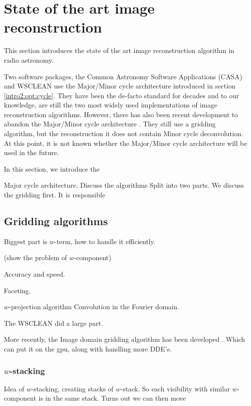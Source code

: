 \section{State of the art image reconstruction}
This section introduces the state of the art image reconstruction algorithm in radio astronomy. 

Two software packages, the Common Astronomy Software Applications (CASA)\cite{casa2019main} and WSCLEAN\cite{offringa2014wsclean} use the Major/Minor cycle architecture introduced in section \ref{intro2:opt:cycle}. They have been the de-facto standard for decades and to our knowledge, are still the two most widely used implementations of image reconstruction algorithms. However, there has also been recent development to abandon the Major/Minor cycle architecture \cite{pratley2017robust, dabbech2018cygnus}. They still use a gridding algorithm, but the reconstruction it does not contain Minor cycle deconvolution. At this point, it is not known whether the Major/Minor cycle architecture will be used in the future. 


In this section, we introduce the 


Major cycle architecture.
Discuss the algorithms 
Split into two parts. We discuss the gridding first. It is responsible

\subsection{Gridding algorithms}
Biggest part is $w$-term, how to handle it efficiently.


(show the problem of $w$-component)

Accuracy and speed.

Faceting.

$w$-projection algorithm \cite{cornwell2008noncoplanar}
Convolution in the Fourier domain.

The WSCLEAN \cite{offringa2014wsclean} did a large part.

More recently, the Image domain gridding algorithm has been developed \cite{veenboer2017image}. Which can put it on the gpu, along with handling more DDE's.

\subsubsection{$w$-stacking}
Idea of $w$-stacking, creating stacks of $w$-stack. So each visibility with similar $w$-component is in the same stack. Turns out we can then move

